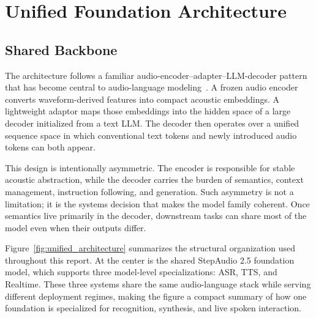 \section{Unified Foundation Architecture}
\label{sec:architecture}

\subsection{Shared Backbone}

The architecture follows a familiar audio-encoder--adapter--LLM-decoder pattern that has become central to audio-language modeling~\citep{wu2025stepaudio2technicalreport,xu2025qwen3omnitechnicalreport}. A frozen audio encoder converts waveform-derived features into compact acoustic embeddings. A lightweight adaptor maps those embeddings into the hidden space of a large decoder initialized from a text LLM. The decoder then operates over a unified sequence space in which conventional text tokens and newly introduced audio tokens can both appear.

This design is intentionally asymmetric. The encoder is responsible for stable acoustic abstraction, while the decoder carries the burden of semantics, context management, instruction following, and generation. Such asymmetry is not a limitation; it is the systems decision that makes the model family coherent. Once semantics live primarily in the decoder, downstream tasks can share most of the model even when their outputs differ.

Figure~\ref{fig:unified_architecture} summarizes the structural organization used throughout this report. At the center is the shared StepAudio 2.5 foundation model, which supports three model-level specializations: ASR, TTS, and Realtime. These three systems share the same audio-language stack while serving different deployment regimes, making the figure a compact summary of how one foundation is specialized for recognition, synthesis, and live spoken interaction.

